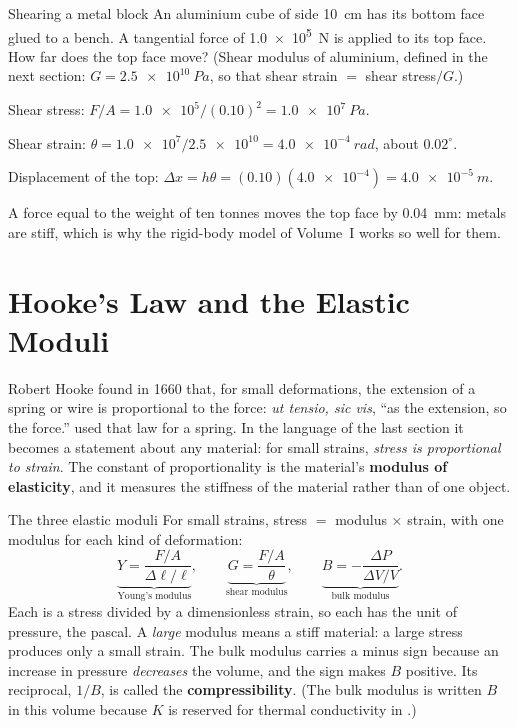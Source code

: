 \begin{exbox}{Shearing a metal block}\label{ex:solids-shear}
An aluminium cube of side \SI{10}{cm} has its bottom face glued to a bench. A tangential force of
\SI{1.0e5}{N} is applied to its top face. How far does the top face move? (Shear modulus of aluminium,
defined in the next section: $G=\SI{2.5e10}{Pa}$, so that shear strain $=$ shear stress$/G$.)

 Shear stress: $F/A=\num{1.0e5}/(0.10)^2=\SI{1.0e7}{Pa}$.

 Shear strain: $\theta=\num{1.0e7}/\num{2.5e10}=\SI{4.0e-4}{rad}$, about $0.02^\circ$.

 Displacement of the top: $\Delta x=h\theta=(0.10)(\num{4.0e-4})=\SI{4.0e-5}{m}$.

\smallskip
A force equal to the weight of ten tonnes moves the top face by \SI{0.04}{mm}: metals are stiff, which is
why the rigid-body model of Volume~I works so well for them. 
\end{exbox}

\section{Hooke's Law and the Elastic Moduli}\label{sec:solids-moduli}

Robert Hooke found in 1660 that, for small deformations, the extension of a spring or wire is
proportional to the force: \emph{ut tensio, sic vis}, ``as the extension, so the force.''
 used that law for a spring. In the language of the last section it becomes a
statement about any material: for small strains, \emph{stress is proportional to strain}. The constant of
proportionality is the material's \textbf{modulus of elasticity}, and it measures the stiffness of the
material rather than of one object.

\begin{keybox}{The three elastic moduli}
For small strains, stress $=$ modulus $\times$ strain, with one modulus for each kind of deformation:
\[
\underbrace{Y=\frac{F/A}{\Delta\ell/\ell}}_{\text{Young's modulus}},\qquad
\underbrace{G=\frac{F/A}{\theta}}_{\text{shear modulus}},\qquad
\underbrace{B=-\frac{\Delta P}{\Delta V/V}}_{\text{bulk modulus}}.
\]
Each is a stress divided by a dimensionless strain, so each has the unit of pressure, the pascal. A
\emph{large} modulus means a stiff material: a large stress produces only a small strain. The bulk
modulus carries a minus sign because an increase in pressure \emph{decreases} the volume, and the sign
makes $B$ positive. Its reciprocal, $1/B$, is called the \textbf{compressibility}. (The bulk modulus is
written $B$ in this volume because $K$ is reserved for thermal conductivity in .)
\end{keybox}

